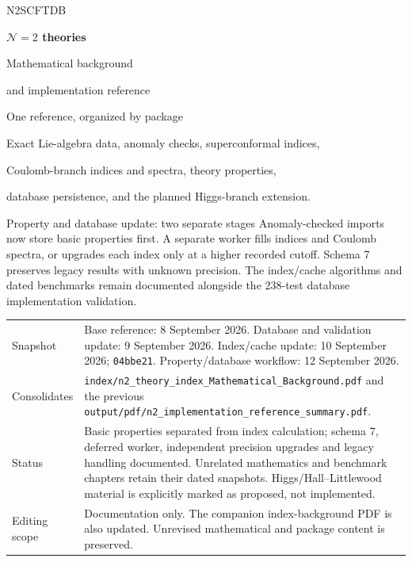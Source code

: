 \documentclass[11pt,a4paper]{article}
\numberwithin{equation}{section}
\newcommand{\code}[1]{{\small\nolinkurl{#1}}}
\begin{document}
\hypersetup{pageanchor=false}
\begin{titlepage}
\vspace*{13mm}
{\sffamily\color{accent}\large N2SCFTDB}\par
\vspace{10mm}
{\sffamily\bfseries\color{ink}\Huge $\mathcal N=2$ theories}\par
\vspace{5mm}
{\sffamily\color{ink}\LARGE Mathematical background\par and implementation reference}\par
\vspace{12mm}
{\Large One reference, organized by package}\par
\vspace{6mm}
Exact Lie-algebra data, anomaly checks, superconformal indices,\par
Coulomb-branch indices and spectra, theory properties,\par
database persistence, and the planned Higgs-branch extension.
\vspace{11mm}
\begin{note}{Property and database update: two separate stages}
Anomaly-checked imports now store basic properties first. A separate worker
fills indices and Coulomb spectra, or upgrades each index only at a higher
recorded cutoff. Schema 7 preserves legacy results with unknown precision.
The index/cache algorithms and dated benchmarks remain documented alongside
the 238-test database implementation validation.
\end{note}
\vfill
\begin{tabularx}{\textwidth}{@{}p{31mm}Y@{}}
Snapshot & Base reference: 8 September 2026. Database and validation update:
9 September 2026. Index/cache update: 10 September 2026; \code{04bbe21}. Property/database workflow: 12 September 2026.\\
Consolidates & \code{index/n2_theory_index_Mathematical_Background.pdf}\newline
and the previous \code{output/pdf/n2_implementation_reference_summary.pdf}.\\
Status & Basic properties separated from index calculation; schema 7, deferred
worker, independent precision upgrades and legacy handling documented.
Unrelated mathematics and benchmark chapters retain their dated snapshots.
Higgs/Hall--Littlewood material is explicitly marked as proposed, not implemented.\\
Editing scope & Documentation only. The companion index-background PDF is also
updated. Unrevised mathematical and package content is preserved.\\
\end{tabularx}
\end{titlepage}
\hypersetup{pageanchor=true}
\end{document}
